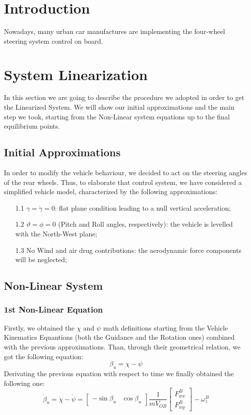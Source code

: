 \documentclass[a4paper,12pt,titlepage]{report}
\begin{document}
	\tableofcontents
\chapter{Introduction}
	Nowadays, many urban car manufactures are implementing the four-wheel steering system control on board.
\chapter{System Linearization}
	In this section we are going to describe the procedure we adopted in order to get the Linearized System. We will show our initial approximations and the main step we took, starting from the Non-Linear system equations up to the final equilibrium points. 
\section{Initial Approximations} \label{approx}	
	In order to modify the vehicle behaviour, we decided to act on the steering angles of the rear wheels. Thus, to elaborate that control system, we have considered a simplified vehicle model, characterized by the following approximations:
		\begin{itemize}
			\item[1.1] $ \gamma=\dot{\gamma}=0 $: flat plane condition leading to a null vertical acceleration;
			\item[1.2] $\vartheta = \phi = 0$ (Pitch and Roll angles, respectively): the vehicle is levelled with the North-West plane; 
			\item[1.3] No Wind and air drug contributions: the aerodynamic force components will be neglected;
		\end{itemize} 
\section{Non-Linear System}
	\subsection{1st Non-Linear Equation} 	
		Firstly, we obtained the $\chi$ and $\psi$ math definitions starting from the Vehicle Kinematics Equantions (both the Guidance and the Rotation ones) combined with the previous approximations. Than, through their geometrical relation, we got the following equation:
			\begin{equation}
				\beta_{u} = \chi - \psi
			\end{equation}
			Derivating the previous equation with respect to time we finally obtained the following one:
			\begin{equation} \label{Betaudot}
				\dot{\beta}_{u} = \dot\chi - \dot\psi = 
				\begin{bmatrix}
				- \sin\beta_{u} & \cos\beta_{u}
				\end{bmatrix}
				\frac{1}{mV_{OB}}
				\begin{bmatrix}
				F_{wx}^{B} \\ F_{wy}^{B}
				\end{bmatrix}
				-\omega_{z}^{B}
			\end{equation}
\end{document}
